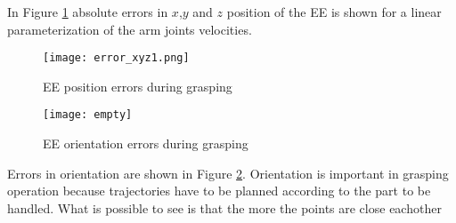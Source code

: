 	In Figure \ref{error_xyz1} absolute errors in $x$,$y$ and $z$ position of the EE is shown for a linear parameterization of the arm joints velocities.
	\begin{figure}[h!]
	\centering
	\texttt{[image: error\_xyz1.png]}
	\caption{EE position errors during grasping}
	\label{error_xyz1}
	\end{figure}
	\begin{figure}[h!]
	\centering
	\texttt{[image: empty]}
	\caption{EE orientation errors during grasping}
	\label{error_orient1}
	\end{figure}

	Errors in orientation are shown in Figure \ref{error_orient1}. Orientation is important in grasping operation because trajectories have to be planned according to the part to be handled. What is possible to see is that the more the points are close eachother  

